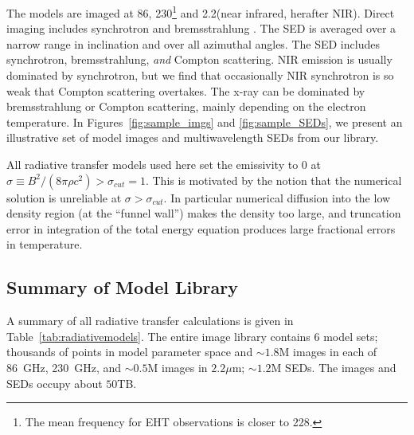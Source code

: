 The models are imaged at 86\GHz, 230\GHz\footnote{The mean frequency for  EHT observations is closer to 228\GHz.} and 2.2\um (near infrared, herafter NIR).
Direct imaging includes synchrotron and bremsstrahlung \citep[both ion-electron and electron-electron; see][for a recent review]{2020ApJ...898...50Y}.
The SED is averaged over a narrow range in inclination and over all azimuthal angles.
The SED includes synchrotron, bremsstrahlung, \emph{and} Compton scattering.
NIR emission is usually dominated by synchrotron, but we find that occasionally NIR synchrotron is so weak that Compton scattering overtakes.
The x-ray can be dominated by bremsstrahlung or Compton scattering, mainly depending on the electron temperature.
In Figures~\ref{fig:sample_imgs} and \ref{fig:sample_SEDs}, we present an illustrative set of model images and multiwavelength SEDs from our library.

All radiative transfer models used here set the emissivity to $0$ at $\sigma \equiv B^2/(8\pi\rho c^2) > \sigma_{cut} = 1$.  This is motivated by the notion that the numerical solution is unreliable at $\sigma > \sigma_{cut}$.  In particular numerical diffusion into the low density region (at the ``funnel wall'') makes the density too large, and truncation error in integration of the total energy equation produces large fractional errors in temperature.

\subsection{Summary of \sgra Model Library}


A summary of all radiative transfer calculations is given in Table~\ref{tab:radiativemodels}. The entire image library
contains $6$ model sets; thousands of points in model parameter space and
$\sim 1.8$M images in each of 86~GHz, 230~GHz, and $\sim0.5$M images in $2.2\mu$m;
$\sim1.2$M SEDs.  The images and SEDs occupy about $50$TB.

